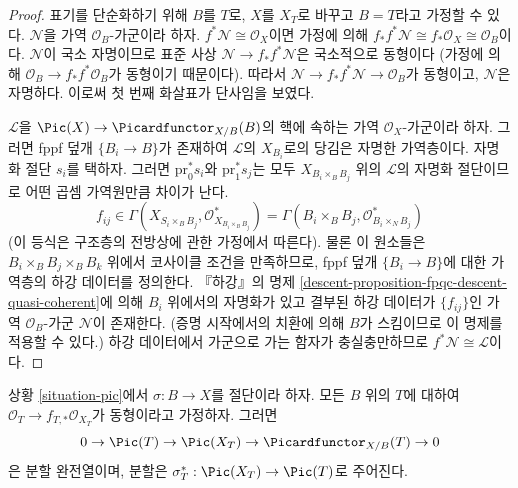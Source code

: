 \begin{proof}
표기를 단순화하기 위해 $B$를 $T$로, $X$를 $X_T$로 바꾸고
$B = T$라고 가정할 수 있다. $\mathcal{N}$을 가역
$\mathcal{O}_B$-가군이라 하자. $f^*\mathcal{N} \cong \mathcal{O}_X$이면
가정에 의해 $f_*f^*\mathcal{N} \cong f_*\mathcal{O}_X \cong \mathcal{O}_B$이다.
$\mathcal{N}$이 국소 자명이므로 표준 사상
$\mathcal{N} \to f_*f^*\mathcal{N}$은 국소적으로 동형이다
(가정에 의해 $\mathcal{O}_B \to f_*f^*\mathcal{O}_B$가 동형이기 때문이다).
따라서 $\mathcal{N} \to f_*f^*\mathcal{N} \to \mathcal{O}_B$가 동형이고,
$\mathcal{N}$은 자명하다. 이로써 첫 번째 화살표가 단사임을 보였다.

\medskip\noindent
$\mathcal{L}$을 $\Pic(X) \to \Picardfunctor_{X/B}(B)$의 핵에 속하는
가역 $\mathcal{O}_X$-가군이라 하자. 그러면 fppf 덮개
$\{B_i \to B\}$가 존재하여 $\mathcal{L}$의 $X_{B_i}$로의 당김은
자명한 가역층이다. 자명화 절단 $s_i$를 택하자. 그러면
$\text{pr}_0^*s_i$와 $\text{pr}_1^*s_j$는 모두
$X_{B_i \times_B B_j}$ 위의 $\mathcal{L}$의 자명화 절단이므로
어떤 곱셈 가역원만큼 차이가 난다.
$$
f_{ij} \in
\Gamma(X_{S_i \times_B B_j}, \mathcal{O}_{X_{B_i \times_B B_j}}^*) =
\Gamma(B_i \times_B B_j, \mathcal{O}_{B_i \times_N B_j}^*)
$$
(이 등식은 구조층의 전방상에 관한 가정에서 따른다).
물론 이 원소들은 $B_i \times_B B_j \times_B B_k$ 위에서 코사이클 조건을
만족하므로, fppf 덮개 $\{B_i \to B\}$에 대한 가역층의 하강 데이터를
정의한다. 『하강』의 명제
\ref{descent-proposition-fpqc-descent-quasi-coherent}에 의해 $B_i$ 위에서의
자명화가 있고 결부된 하강 데이터가 $\{f_{ij}\}$인 가역
$\mathcal{O}_B$-가군 $\mathcal{N}$이 존재한다. (증명 시작에서의
치환에 의해 $B$가 스킴이므로 이 명제를 적용할 수 있다.)
하강 데이터에서 가군으로 가는 함자가 충실충만하므로
$f^*\mathcal{N} \cong \mathcal{L}$이다.
\end{proof}

\begin{lemma}
\label{lemma-flat-geometrically-connected-fibres-with-section}
상황 \ref{situation-pic}에서 $\sigma : B \to X$를 절단이라 하자.
모든 $B$ 위의 $T$에 대하여
$\mathcal{O}_T \to f_{T, *}\mathcal{O}_{X_T}$가 동형이라고 가정하자.
그러면
$$
0 \to \Pic(T) \to \Pic(X_T) \to \Picardfunctor_{X/B}(T) \to 0
$$
은 분할 완전열이며, 분할은
$\sigma_T^* : \Pic(X_T) \to \Pic(T)$로 주어진다.
\end{lemma}


